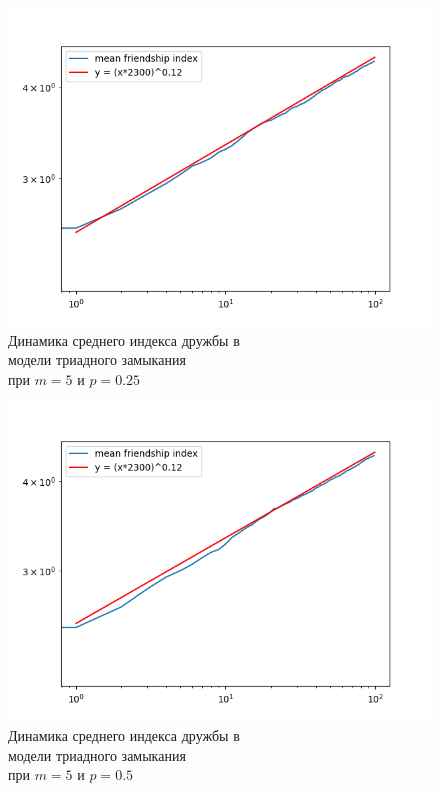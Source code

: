 \documentclass[bachelor, och, diploma]{SCWorks}
\begin{document}
\begin{figure}[!ht]
    \centering
    \includegraphics[scale=0.7]{diploma_results/dynamic_log/triad_mean_beta_5_0.25.png}
    \caption{Динамика среднего индекса дружбы  в\\ модели триадного замыкания\\ при $m=5$ и $p=0.25$}
\end{figure}
\begin{figure}[!ht]
    \centering
    \includegraphics[scale=0.7]{diploma_results/dynamic_log/triad_mean_beta_5_0.5.png}
    \caption{Динамика среднего индекса дружбы  в\\ модели триадного замыкания\\ при $m=5$ и $p=0.5$}
\end{figure}
\end{document}
